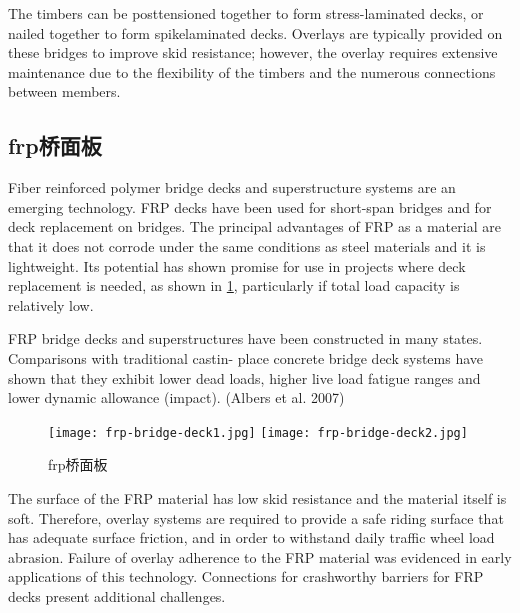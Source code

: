 The timbers can be posttensioned together to form stress-laminated decks, or nailed together to form spikelaminated decks. Overlays are typically provided on these bridges to improve skid resistance; however, the overlay requires extensive maintenance due to the flexibility of the timbers and the numerous connections between members.

\subsection{\texorpdfstring{\acrlong*{frp}}{FRP}桥面板}

Fiber reinforced polymer bridge decks and superstructure systems are an emerging technology. FRP decks have been used for short-span bridges and for deck replacement on bridges. The principal advantages of FRP as a material are that it does not corrode under the same conditions as steel materials and it is lightweight. Its potential has shown promise for use in projects where deck replacement is needed, as shown in \cref{fig:frp-bridge-deck}, particularly if total load capacity is relatively low.

FRP bridge decks and superstructures have been constructed in many states. Comparisons with traditional castin- place concrete bridge deck systems have shown that they exhibit lower dead loads, higher live load fatigue ranges and lower dynamic allowance (impact). (Albers et al. 2007)

\begin{figure}
  \texttt{[image: frp-bridge-deck1.jpg]}\hfill
  \texttt{[image: frp-bridge-deck2.jpg]}
  \caption{\acrshort*{frp}桥面板}
  \label{fig:frp-bridge-deck}
\end{figure}

The surface of the FRP material has low skid resistance and the material itself is soft. Therefore, overlay systems are required to provide a safe riding surface that has adequate surface friction, and in order to withstand daily traffic wheel load abrasion. Failure of overlay adherence to the FRP material was evidenced in early applications of this technology. Connections for crashworthy barriers for FRP decks present additional challenges.


